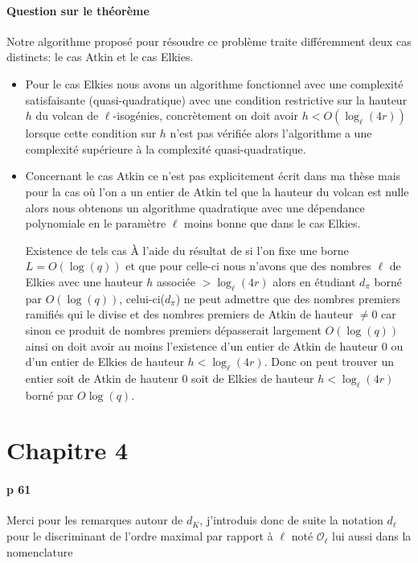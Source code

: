 \documentclass[10pt,a4paper]{article}
\theoremstyle{plain}
\theoremstyle{definition}
\theoremstyle{definition}
\theoremstyle{definition}
\theoremstyle{definition}
\theoremstyle{definition}
\theoremstyle{remark}
\theoremstyle{remark}
\theoremstyle{definition}
\begin{document}
\paragraph{Question sur le théorème}{Notre algorithme proposé pour résoudre ce 
problème traite différemment deux cas distincts: le cas Atkin et le cas Elkies.
\begin{itemize}

\item {} Pour le cas Elkies nous avons un algorithme fonctionnel avec une complexité
satisfaisante (quasi-quadratique) avec une condition restrictive sur la hauteur
$h$ du volcan de $\ell$-isogénies, concrètement on doit avoir $h< O(\log_{\ell}
(4r))$ lorsque cette condition sur $h$ n'est pas vérifiée alors 
l'algorithme a une complexité supérieure à la complexité quasi-quadratique. 
\item  Concernant le cas Atkin ce n'est pas explicitement écrit dans ma thèse mais 
pour la cas où l'on a un entier de Atkin tel que la hauteur du volcan est 
nulle alors nous obtenons un algorithme quadratique avec une dépendance 
polynomiale en le paramètre $\ell$ moins bonne que dans le cas Elkies. 
\item[Existence de tels cas]\`A l'aide du résultat de 
\cite[Theorem 1]{ShparlinskiSutherland14} si l'on fixe une 
borne $L=O(\log(q))$ et que pour celle-ci nous n'avons que des nombres $\ell$ de 
Elkies avec une hauteur $h$ associée $>\log_{\ell}(4r)$ alors en étudiant 
$d_{\pi}$ borné par $O(\log(q))$, celui-ci($d_{\pi}$) ne peut admettre que des
nombres premiers ramifiés qui le divise et des nombres premiers de Atkin de 
hauteur $\neq 0$ car sinon ce produit de nombres premiers dépasserait largement
$O(\log(q))$ ainsi on doit avoir au moins l'existence d'un entier de Atkin de 
hauteur $0$  ou d'un entier de Elkies de hauteur $h<\log_{\ell}(4r)$. Donc on 
peut trouver un entier soit de Atkin de hauteur $0$ soit de Elkies de hauteur 
$h<\log_{\ell}(4r)$ borné par $O\log(q)$.

\end{itemize}
}

\section{Chapitre 4}

\paragraph{p 61}{Merci pour les remarques autour de $d_{K}$, j'introduis donc de suite la notation $d_{\ell}$ pour le discriminant de l'ordre maximal par rapport à $\ell$ noté $\mathcal{O}_{\ell}$ lui aussi dans la nomenclature}
\end{document}
